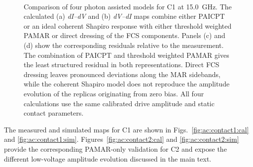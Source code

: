         \begin{figure}
            \centering
            \hfill%
            \\%
            \hfill
            \caption{Comparison of four photon assisted models for C1 at \qty{15.0}{\giga\hertz}. The calculated (a) \textit{dI--dV} and (b) \textit{dV--dI} maps combine either PAICPT or an ideal coherent Shapiro response with either threshold weighted PAMAR or direct dressing of the FCS components. Panels (c) and (d) show the corresponding residuals relative to the measurement. The combination of PAICPT and threshold weighted PAMAR gives the least structured residual in both representations. Direct FCS dressing leaves pronounced deviations along the MAR sidebands, while the coherent Shapiro model does not reproduce the amplitude evolution of the replicas originating from zero bias. All four calculations use the same calibrated drive amplitude and static contact parameters.}
            \label{fig:ac:contact1:model-comparison}
        \end{figure}

        The measured and simulated maps for C1 are shown in Figs.~\ref{fig:ac:contact1:cal} and \ref{fig:ac:contact1:sim}. Figures~\ref{fig:ac:contact2:cal} and \ref{fig:ac:contact2:sim} provide the corresponding PAMAR-only validation for C2 and expose the different low-voltage amplitude evolution discussed in the main text.

